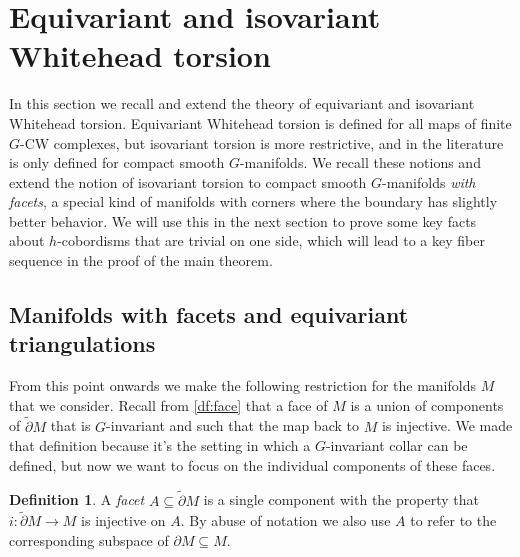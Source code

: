 \documentclass[11pt]{amsart}
\theoremstyle{definition}
\newtheorem{defn}{Definition}[section]
\numberwithin{equation}{section}
\numberwithin{figure}{section}
\newcommand{\R}{\mathbb R}
\newcommand{\ti}{\widetilde}
\newcommand{\St}{\mathrm{St}}
\newcommand{\ourdefn}[1]{{\it #1}}
\begin{document}
%
%



\section{Equivariant and isovariant Whitehead torsion}\label{sec:torsion}

In this section we recall and extend the theory of equivariant and isovariant Whitehead torsion. Equivariant Whitehead torsion is defined for all maps of finite $G$-CW complexes, but isovariant torsion is more restrictive, and in the literature is only defined for compact smooth $G$-manifolds. We recall these notions and extend the notion of isovariant torsion to compact smooth $G$-manifolds \emph{with facets}, a special kind of manifolds with corners where the boundary has slightly better behavior. We will use this in the next section to prove some key facts about $h$-cobordisms that are trivial on one side, which will lead to a key fiber sequence in the proof of the main theorem.

\subsection{Manifolds with facets and equivariant triangulations}

From this point onwards we make the following restriction for the manifolds $M$ that we consider. Recall from \autoref{df:face} that a face of $M$ is a union of components of $\ti\partial M$ that is $G$-invariant and such that the map back to $M$ is injective. We made that definition because it's the setting in which a $G$-invariant collar can be defined, but now we want to focus on the individual components of these faces.
\begin{defn}
	A \ourdefn{facet} $A \subseteq \ti\partial M$ is a single component with the property that $i\colon \ti\partial M \to M$ is injective on $A$. By abuse of notation we also use $A$ to refer to the corresponding subspace of $\partial M \subseteq M$.
\end{defn}
\end{document}
